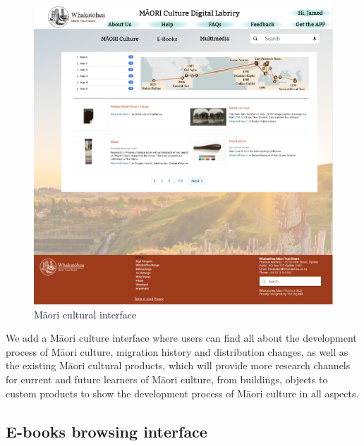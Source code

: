 \begin{figure}[htbp]
  \centerline{\includegraphics[width=400pt]{images/3-1-3.png}}
  \caption{Māori cultural interface}
  \label{fig30}
\end{figure}

We add a Māori culture interface where users can find all about the development process of Māori culture, migration history and distribution changes, as well as the existing Māori cultural products, which will provide more research channels for current and future learners of Māori culture, from buildings, objects to custom products to show the development process of Māori culture in all aspects\cite{MāoriCul4:online}.

\subsection{E-books browsing interface}

